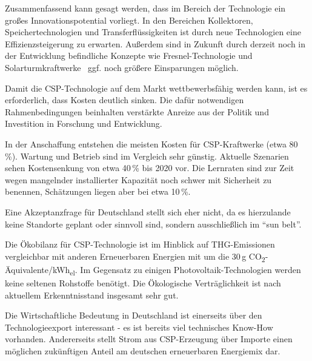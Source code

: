 Zusammenfassend kann gesagt werden, dass im Bereich der Technologie ein großes Innovationspotential vorliegt. In den Bereichen Kollektoren, Speichertechnologien und Transferflüssigkeiten ist durch neue Technologien eine Effizienzsteigerung zu erwarten. Außerdem sind in Zukunft durch derzeit noch in der Entwicklung befindliche Konzepte wie Fresnel-Technologie und Solarturmkraftwerke~\cite{irena2012} ggf. noch größere Einsparungen möglich.

Damit die CSP-Technologie auf dem Markt wettbewerbsfähig werden kann, ist es erforderlich, dass Kosten deutlich sinken. Die dafür notwendigen Rahmenbedingungen beinhalten verstärkte Anreize aus der Politik und Investition in Forschung und Entwicklung.

In der Anschaffung entstehen die meisten Kosten für CSP-Kraftwerke (etwa 80\,\%). Wartung und Betrieb sind im Vergleich sehr günstig. Aktuelle Szenarien sehen Kostensenkung von etwa 40\,\% bis 2020 vor. Die Lernraten sind zur Zeit wegen mangelnder installierter Kapazität noch schwer mit Sicherheit zu benennen, Schätzungen liegen aber bei etwa 10\,\%.

Eine Akzeptanzfrage für Deutschland stellt sich eher nicht, da es hierzulande keine Standorte geplant oder sinnvoll sind, sondern ausschließlich im "`sun belt"'.

Die Ökobilanz für CSP-Technologie ist im Hinblick auf THG-Emissionen vergleichbar mit anderen Erneuerbaren Energien mit um die 30\,g CO\textsubscript{2}-Äquivalente/kWh\textsubscript{el}. Im Gegensatz zu einigen Photovoltaik-Technologien werden keine seltenen Rohstoffe benötigt. Die Ökologische Verträglichkeit ist nach aktuellem Erkenntnisstand insgesamt sehr gut.

Die Wirtschaftliche Bedeutung in Deutschland ist einerseits über den Technologieexport interessant - es ist bereits viel technisches Know-How vorhanden.
Andererseits stellt Strom aus CSP-Erzeugung über Importe einen möglichen zukünftigen Anteil am deutschen erneuerbaren Energiemix dar.

